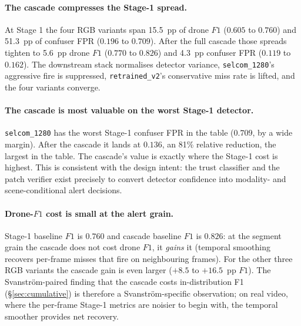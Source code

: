 \documentclass[12pt,a4paper,oneside,openright]{book}
\begin{document}
\paragraph{The cascade compresses the Stage-1 spread.}
At Stage 1 the four RGB variants span 15.5~pp of drone $F1$ ($0.605$ to $0.760$) and 51.3~pp of confuser FPR ($0.196$ to $0.709$). After the full cascade those spreads tighten to 5.6~pp drone $F1$ ($0.770$ to $0.826$) and 4.3~pp confuser FPR ($0.119$ to $0.162$). The downstream stack normalises detector variance, \texttt{selcom\_1280}'s aggressive fire is suppressed, \texttt{retrained\_v2}'s conservative miss rate is lifted, and the four variants converge.

\paragraph{The cascade is most valuable on the worst Stage-1 detector.}
\texttt{selcom\_1280} has the worst Stage-1 confuser FPR in the table ($0.709$, by a wide margin). After the cascade it lands at $0.136$, an 81\% relative reduction, the largest in the table. The cascade's value is exactly where the Stage-1 cost is highest. This is consistent with the design intent: the trust classifier and the patch verifier exist precisely to convert detector confidence into modality- and scene-conditional alert decisions.

\paragraph{Drone-$F1$ cost is small at the alert grain.}
Stage-1 baseline $F1$ is $0.760$ and cascade baseline $F1$ is $0.826$: at the segment grain the cascade does not cost drone $F1$, it \emph{gains} it (temporal smoothing recovers per-frame misses that fire on neighbouring frames). For the other three RGB variants the cascade gain is even larger ($+8.5$ to $+16.5$~pp $F1$). The Svanstr\"om-paired finding that the cascade costs in-distribution F1 (\S\ref{sec:cumulative}) is therefore a Svanstr\"om-specific observation; on real video, where the per-frame Stage-1 metrics are noisier to begin with, the temporal smoother provides net recovery.
\end{document}
